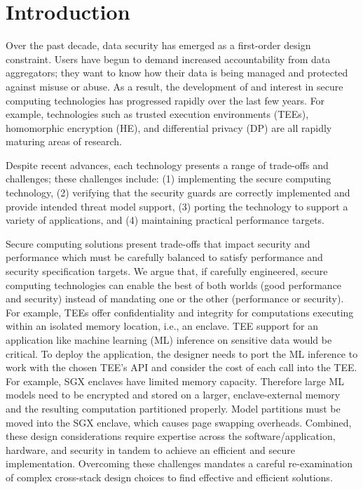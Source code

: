\section{Introduction}
\label{sec:introduction}

Over the past decade, data security has emerged as a first-order design constraint.
Users have begun to demand increased accountability from data aggregators; they want to know how their data is being managed and protected against misuse or abuse.
As a result, the development of and interest in secure computing technologies has progressed rapidly over the last few years.
For example, technologies such as trusted execution environments (TEEs), homomorphic encryption (HE), and differential privacy (DP) are all rapidly maturing areas of research.

Despite recent advances, each technology presents a range of trade-offs and challenges; these challenges include:
(1) implementing the secure computing technology,
(2) verifying that the security guards are correctly implemented and provide intended threat model support,
(3) porting the technology to support a variety of applications,
and (4) maintaining practical performance targets.


Secure computing solutions present trade-offs that impact security and performance which must be carefully balanced to satisfy performance and security specification targets.
We argue that, if carefully engineered, secure computing technologies can enable the best of both worlds (good performance and security) instead of mandating one or the other (performance or security).
For example, TEEs offer confidentiality and integrity for computations executing within an isolated memory location, i.e., an enclave.
TEE support for an application like machine learning (ML) inference on sensitive data would be critical.
To deploy the application, the designer needs to port the ML inference to work with the chosen TEE's API and consider the cost of each call into the TEE.
For example, SGX enclaves have limited memory capacity.
Therefore large ML models need to be encrypted and stored on a larger, enclave-external memory and the resulting computation partitioned properly.
Model partitions must be moved into the SGX enclave, which causes page swapping overheads.
Combined, these design considerations require expertise across the software/application, hardware, and security in tandem to achieve an efficient and secure implementation.
Overcoming these challenges mandates a careful re-examination of complex cross-stack design choices to find effective and efficient solutions.

